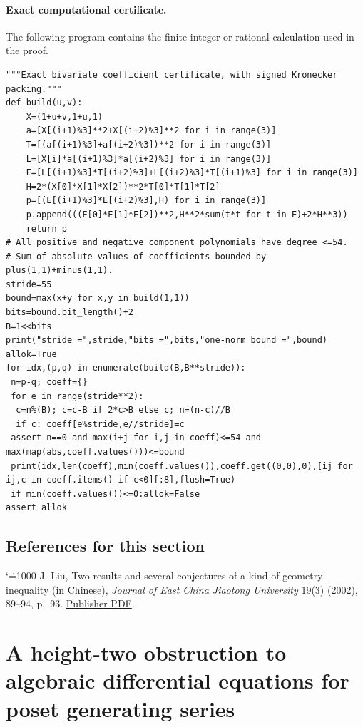 \documentclass[11pt,a4paper]{article}
\makeatletter
\numberwithin{equation}{section}
\theoremstyle{definition}
\theoremstyle{remark}
\renewenvironment{thebibliography}[1]
 {\subsection*{References for this section}\small
  \list{\@biblabel{\@arabic\c@enumiv}}
       {\settowidth\labelwidth{\@biblabel{#1}}\leftmargin\labelwidth
        \advance\leftmargin\labelsep\@openbib@code
        \usecounter{enumiv}\let\p@enumiv\@empty
        \renewcommand\theenumiv{\@arabic\c@enumiv}}
  \sloppy\clubpenalty4000\widowpenalty4000\sfcode`\.=1000\relax}
 {\def\@noitemerr{\@latex@warning{Empty bibliography}}\endlist}
\makeatother
\begin{document}
\paragraph{Exact computational certificate.}
The following program contains the finite integer or rational calculation used in the proof.
{\small
\begin{Verbatim}
"""Exact bivariate coefficient certificate, with signed Kronecker packing."""
def build(u,v):
    X=(1+u+v,1+u,1)
    a=[X[(i+1)%3]**2+X[(i+2)%3]**2 for i in range(3)]
    T=[(a[(i+1)%3]+a[(i+2)%3])**2 for i in range(3)]
    L=[X[i]*a[(i+1)%3]*a[(i+2)%3] for i in range(3)]
    E=[L[(i+1)%3]*T[(i+2)%3]+L[(i+2)%3]*T[(i+1)%3] for i in range(3)]
    H=2*(X[0]*X[1]*X[2])**2*T[0]*T[1]*T[2]
    p=[(E[(i+1)%3]*E[(i+2)%3],H) for i in range(3)]
    p.append(((E[0]*E[1]*E[2])**2,H**2*sum(t*t for t in E)+2*H**3))
    return p
# All positive and negative component polynomials have degree <=54.
# Sum of absolute values of coefficients bounded by plus(1,1)+minus(1,1).
stride=55
bound=max(x+y for x,y in build(1,1))
bits=bound.bit_length()+2
B=1<<bits
print("stride =",stride,"bits =",bits,"one-norm bound =",bound)
allok=True
for idx,(p,q) in enumerate(build(B,B**stride)):
 n=p-q; coeff={}
 for e in range(stride**2):
  c=n%(B); c=c-B if 2*c>B else c; n=(n-c)//B
  if c: coeff[e%stride,e//stride]=c
 assert n==0 and max(i+j for i,j in coeff)<=54 and max(map(abs,coeff.values()))<=bound
 print(idx,len(coeff),min(coeff.values()),coeff.get((0,0),0),[ij for ij,c in coeff.items() if c<0][:8],flush=True)
 if min(coeff.values())<=0:allok=False
assert allok
\end{Verbatim}

}

\begin{thebibliography}{1}
 J. Liu, Two results and several conjectures of a kind of geometry inequality (in Chinese), \emph{Journal of East China Jiaotong University} 19(3) (2002), 89--94, p.~93. \href{https://journal.ecjtu.edu.cn/hdjtdx/article/pdf/20020327}{Publisher PDF}.
\end{thebibliography}

\par\endgroup

\begingroup

\section{\texorpdfstring{A height-two obstruction to algebraic differential equations for poset generating series}{A height-two obstruction to algebraic differential equations for poset generating series}}\label{section:r44taisho}
\par\medskip
\end{document}
